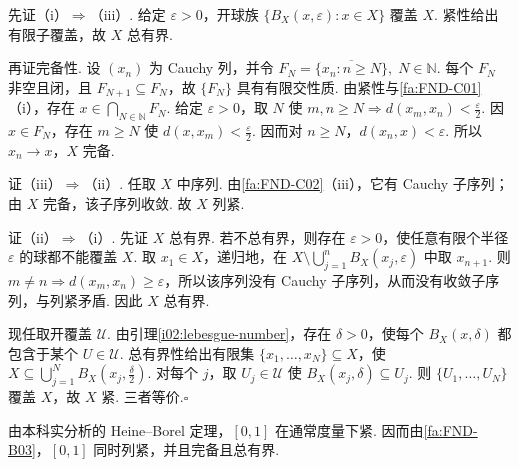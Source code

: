 \begin{FAProof}
先证（i）\(\displaystyle \Rightarrow\)（iii）. 给定 \(\displaystyle \varepsilon>0\)，开球族 \(\displaystyle \{B_X(x,\varepsilon):x\in X\}\) 覆盖 \(\displaystyle X\). 紧性给出有限子覆盖，故 \(\displaystyle X\) 总有界.

再证完备性. 设 \(\displaystyle (x_n)\) 为 Cauchy 列，并令 \(\displaystyle F_N=\overline{\{x_n:n\geqslant N\}},\; N\in\mathbb N\).
每个 \(\displaystyle F_N\) 非空且闭，且 \(\displaystyle F_{N+1}\subseteq F_N\)，故 \(\displaystyle \{F_N\}\) 具有有限交性质. 由紧性与\autoref{fa:FND-C01}（i），存在 \(\displaystyle x\in\bigcap_{N\in\mathbb N}F_N\). 给定 \(\displaystyle \varepsilon>0\)，取 \(\displaystyle N\) 使 \(\displaystyle m,n\geqslant N\Rightarrow d(x_m,x_n)<\frac{\varepsilon}{2}\). 因 \(\displaystyle x\in F_N\)，存在 \(\displaystyle m\geqslant N\) 使 \(\displaystyle d(x,x_m)<\frac{\varepsilon}{2}\). 因而对 \(\displaystyle n\geqslant N\)，\(\displaystyle d(x_n,x)<\varepsilon\). 所以 \(\displaystyle x_n\to x\)，\(\displaystyle X\) 完备.

证（iii）\(\displaystyle \Rightarrow\)（ii）. 任取 \(\displaystyle X\) 中序列. 由\autoref{fa:FND-C02}（iii），它有 Cauchy 子序列；由 \(\displaystyle X\) 完备，该子序列收敛. 故 \(\displaystyle X\) 列紧.

证（ii）\(\displaystyle \Rightarrow\)（i）. 先证 \(\displaystyle X\) 总有界. 若不总有界，则存在 \(\displaystyle \varepsilon>0\)，使任意有限个半径 \(\displaystyle \varepsilon\) 的球都不能覆盖 \(\displaystyle X\). 取 \(\displaystyle x_1\in X\)，递归地，在 \(\displaystyle X\setminus\bigcup_{j=1}^{n}B_X(x_j,\varepsilon)\) 中取 \(\displaystyle x_{n+1}\). 则 \(\displaystyle m\neq n\Rightarrow d(x_m,x_n)\geqslant\varepsilon\)，所以该序列没有 Cauchy 子序列，从而没有收敛子序列，与列紧矛盾. 因此 \(\displaystyle X\) 总有界.

现任取开覆盖 \(\displaystyle \mathcal U\). 由引理\ref{i02:lebesgue-number}，存在 \(\displaystyle \delta>0\)，使每个 \(\displaystyle B_X(x,\delta)\) 都包含于某个 \(\displaystyle U\in\mathcal U\). 总有界性给出有限集 \(\displaystyle \{x_1,\dots,x_N\}\subseteq X\)，使 \(\displaystyle X\subseteq\bigcup_{j=1}^{N}B_X(x_j,\frac{\delta}{2})\).
对每个 \(\displaystyle j\)，取 \(\displaystyle U_j\in\mathcal U\) 使 \(\displaystyle B_X(x_j,\delta)\subseteq U_j\). 则 \(\displaystyle \{U_1,\dots,U_N\}\) 覆盖 \(\displaystyle X\)，故 \(\displaystyle X\) 紧. 三者等价.\hfill\(\square\)
\end{FAProof}

\begin{FAExample}[闭区间]
由本科实分析的 Heine--Borel 定理，\(\displaystyle [0,1]\) 在通常度量下紧. 因而由\autoref{fa:FND-B03}，\(\displaystyle [0,1]\) 同时列紧，并且完备且总有界.
\end{FAExample}


